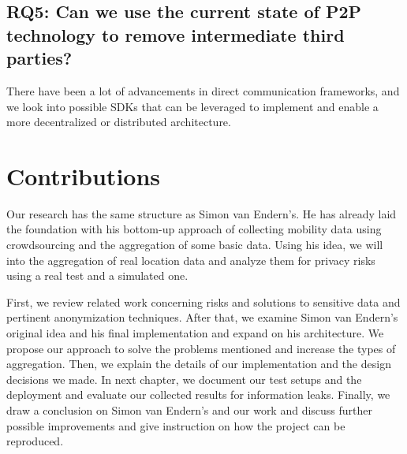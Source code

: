 \subsection*{RQ5: Can we use the current state of P2P technology to remove intermediate third parties?}
There have been a lot of advancements in direct communication frameworks, and we look into possible SDKs that can be leveraged to implement and enable a more decentralized or distributed architecture.

\section{Contributions}
Our research has the same structure as Simon van Endern's. He has already laid the foundation with his bottom-up approach of collecting mobility data using crowdsourcing and the aggregation of some basic data. Using his idea, we will into the aggregation of real location data and analyze them for privacy risks using a real test and a simulated one.


First, we review related work concerning risks and solutions to sensitive data and pertinent anonymization techniques. After that, we examine Simon van Endern's original idea and his final implementation and expand on his architecture. We propose our approach to solve the  problems mentioned and increase the types of aggregation. Then, we explain the details of our implementation and the design decisions we made. In next chapter, we document our test setups and the deployment and evaluate our collected results for information leaks. Finally, we draw a conclusion on Simon van Endern's and our work and discuss further possible improvements and give instruction on how the project can be reproduced.
